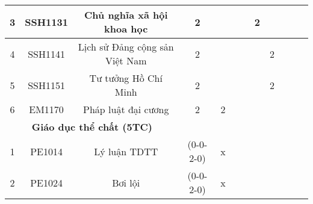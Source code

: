 \documentclass[12pt,a4paper]{report}
\begin{document}
\begin{landscape}
\begin{longtable}[c]{|c|c|c|c|c|c|c|c|c|c|c|c|}
        3                             & SSH1131                         & Chủ nghĩa xã hội khoa học                                    & 2                                                                                    &             &             &             & 2           &             &             &             &             \\ \hline
        4                             & SSH1141                         & Lịch sử Đảng cộng sản Việt Nam                               & 2                                                                                    &             &             &             &             & 2           &             &             &             \\ \hline
        5                             & SSH1151                         & Tư tưởng Hồ Chí Minh                                         & 2                                                                                    &             &             &             &             & 2           &             &             &             \\ \hline
        6                             & EM1170                          & Pháp luật đại cương                                          & 2                                                                                    & 2           &             &             &             &             &             &             &             \\ \hline
        \multicolumn{3}{|c|}{\textbf{Giáo dục thể chất (5TC)}}                                                                         &                                                                                      &             &             &             &             &             &             &             &             \\ \hline
        1                             & PE1014                          & Lý luận TDTT                                                 & (0-0-2-0)                                                                            & x           &             &             &             &             &             &             &             \\ \hline
        2                             & PE1024                          & Bơi lội                                                      & (0-0-2-0)                                                                            & x           &             &             &             &             &             &             &             \\ \hline

\end{longtable}
\end{landscape}
\end{document}
